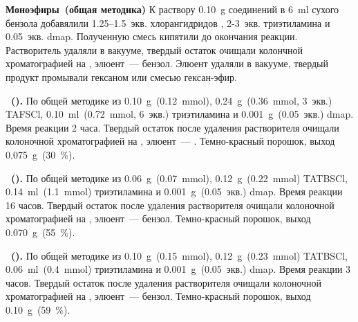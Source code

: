 \textbf{Моноэфиры~(общая методика)}
К раствору \SI{0.10}{\gram} соединений  в \SI{6}{\milli\litre} сухого бензола добавялили 1.25--1.5~экв. хлорангидридов , 2-3~экв. триэтиламина и 0.05~экв. \ac{dmap}.
Полученную смесь кипятили до окончания реакции. 
Растворитель удаляли в вакууме, твердый остаток очищали колончной хроматографией на , элюент~--- бензол. 
Элюент удаляли в вакууме, твердый продукт промывали гексаном или смесью гексан-эфир.

\textbf{~().}  
По общей методике из \SI{0.10}{\gram}~(\SI{0.12}{\milli\mole}), \SI{0.24}{\gram}~(\SI{0.36}{\milli\mole}, 3~экв.) TAFSCl, \SI{0.10}{\milli\litre}~(\SI{0.72}{\milli\mole}, 6~экв.) триэтиламина и \SI{0.001}{\gram}~(0.05~экв.) \ac{dmap}. 
Время реакции 2 часа. Твердый остаток после удаления растворителя очищали колоночной хроматографией на , элюент~--- .
Темно-красный порошок, выход \SI{0.075}{\gram}~(\SI{30}{\percent}).

\textbf{~().} 
По общей методике из \SI{0.06}{\gram}~(\SI{0.07}{\milli\mole}), \SI{0.12}{\gram}~(\SI{0.22}{\milli\mole}) TATBSCl, \SI{0.14}{\milli\litre}~(\SI{1.1}{\milli\mole}) триэтиламина и \SI{0.001}{\gram}~(0.05~экв.) \ac{dmap}. 
Время реакции 16 часов. Твердый остаток после удаления растворителя очищали колоночной хроматографией на , элюент~--- бензол.
Темно-красный порошок, выход \SI{0.070}{\gram}~(\SI{55}{\percent}).

\textbf{~().} 
По общей методике из \SI{0.10}{\gram}~(\SI{0.15}{\milli\mole}), \SI{0.12}{\gram}~(\SI{0.23}{\milli\mole}) TATBSCl, \SI{0.06}{\milli\litre}~(\SI{0.4}{\milli\mole}) триэтиламина и \SI{0.001}{\gram}~(0.05~экв.) \ac{dmap}. 
Время реакции 3 часов. Твердый остаток после удаления растворителя очищали колоночной хроматографией на , элюент~--- бензол.
Темно-красный порошок, выход \SI{0.10}{\gram}~(\SI{59}{\percent}).

